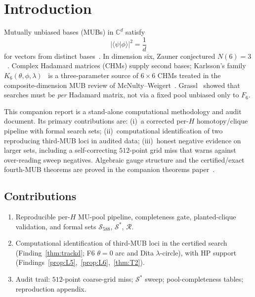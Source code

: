 \documentclass[onecolumn]{IEEEtran}
\begin{document}
\section{Introduction}
\label{sec:intro}

Mutually unbiased bases (MUBs) in $\mathbb{C}^d$ satisfy
\begin{equation}
    \label{eq:mu}
    \bigl|\langle\psi|\phi\rangle\bigr|^2 = \frac{1}{d}
\end{equation}
for vectors from distinct bases~\cite{Bengtsson2007, Brierley2009}.
In dimension six, Zauner conjectured $N(6)=3$~\cite{Zauner1999, Scott2010}.
Complex Hadamard matrices (CHMs) supply second bases; Karlsson's family $K_6(\theta,\phi,\lambda)$~\cite{Karlsson2011} is a three-parameter source of $6\times6$ CHMs treated in the composite-dimension MUB review of McNulty--Weigert~\cite{McNulty2026}.
Grassl~\cite{Grassl2004} showed that searches must be \emph{per} Hadamard matrix, not via a fixed pool unbiased only to $F_6$.

This companion report is a stand-alone computational methodology and audit document.
Its primary contributions are: (i)~a corrected per-$H$ homotopy/clique pipeline with formal search sets; (ii)~computational identification of two reproducing third-MUB loci in audited data; (iii)~honest negative evidence on larger sets, including a self-correcting $512$-point grid miss that warns against over-reading sweep negatives.
Algebraic gauge structure and the certified/exact fourth-MUB theorems are proved in the companion theorems paper~\cite{JaupiTheorems2026}.

\subsection{Contributions}
\begin{enumerate}
    \item[\textbf{M1}] Reproducible per-$H$ MU-pool pipeline, completeness gate, planted-clique validation, and formal sets $\mathcal{S}_{588}$, $\mathcal{S}^*$, $\mathcal{R}$.
    \item[\textbf{M2}] Computational identification of third-MUB loci in the certified search (Finding~\ref{thm:trackd}; F6 $\theta{=}0$ arc and Dita $\lambda$-circle), with HP support (Findings~\ref{prop:L5},~\ref{prop:L6},~\ref{thm:T2}).
    \item[\textbf{M3}] Audit trail: $512$-point coarse-grid miss; $\mathcal{S}^*$ sweep; pool-completeness tables; reproduction appendix.
\end{enumerate}
\end{document}
